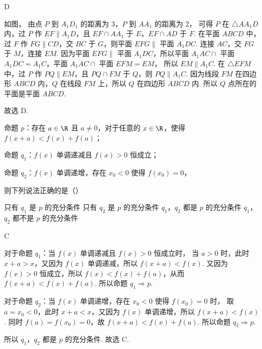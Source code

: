 \begin{answer}
D
\end{answer}

\begin{solution}
如图，
由点 \(P\) 到 \(A_1D_1\) 的距离为 \(3\)，\(P\) 到 \(AA_1\) 的距离为 \(2\)，
可得 \(P\) 在 \(\triangle AA_1D\) 内，过 \(P\) 作 \(EF\parallel A_1D\)，且 \(EF\cap AA_1\) 于 \(E\)，\(EF\cap AD\) 于 \(F\).
在平面 \(ABCD\) 中，过 \(F\) 作 \(FG\parallel CD\)，交 \(BC\) 于 \(G\)，则平面 \(EFG\parallel\) 平面 \(A_1DC\).
连接 \(AC\)，交 \(FG\) 于 \(M\)，连接 \(EM\).
因为平面 \(EFG\parallel\) 平面 \(A_1DC\)，所以平面 \(A_1AC\cap\) 平面 \(A_1DC=A_1C\)，平面 \(A_1AC\cap\) 平面 \(EFM=EM\)，
所以 \(EM\parallel A_1C\).
在 \(\triangle EFM\) 中，过 \(P\) 作 \(PQ\parallel EM\)，且 \(PQ\cap FM\) 于 \(Q\)，则 \(PQ\parallel A_1C\).
因为线段 \(FM\) 在四边形 \(ABCD\) 内，\(Q\) 在线段 \(FM\) 上，所以 \(Q\) 在四边形 \(ABCD\) 内.
所以 \(Q\) 点所在的平面是平面 \(ABCD\).

故选 D.
\end{solution}

\begin{problem}
命题 \(p\)：存在 \(a\in\R\) 且 \(a\neq0\)，对于任意的 \(x\in\R\)，使得 \(f(x+a)<f(x)+f(a)\)；

命题 \(q_1\)：\(f(x)\) 单调递减且 \(f(x)>0\) 恒成立；

命题 \(q_2\)：\(f(x)\) 单调递增，存在 \(x_0<0\) 使得 \(f(x_0)=0\)，

则下列说法正确的是（\quad）

\choices
    {只有 \(q_1\) 是 \(p\) 的充分条件}
    {只有 \(q_2\) 是 \(p\) 的充分条件}
    {\(q_1\)，\(q_2\) 都是 \(p\) 的充分条件}
    {\(q_1\)，\(q_2\) 都不是 \(p\) 的充分条件}
\end{problem}

\begin{answer}
C
\end{answer}

\begin{solution}
对于命题 \(q_1\)：当 \(f(x)\) 单调递减且 \(f(x)>0\) 恒成立时，
当 \(a>0\) 时，此时 \(x+a>x\)，又因为 \(f(x)\) 单调递减，所以 \(f(x+a)<f(x)\).
又因为 \(f(x)>0\) 恒成立，所以 \(f(x)<f(x)+f(a)\)，从而
\(f(x+a)<f(x)+f(a)\).
所以命题 \(q_1\Rightarrow p\).

对于命题 \(q_2\)：当 \(f(x)\) 单调递增，存在 \(x_0<0\) 使得 \(f(x_0)=0\) 时，
取 \(a=x_0<0\)，此时 \(x+a<x\)，又因为 \(f(x)\) 单调递增，所以
\(f(x+a)<f(x)\).
同时 \(f(a)=f(x_0)=0\)，故
\(f(x+a)<f(x)+f(a)\).
所以命题 \(q_2\Rightarrow p\).

所以 \(q_1\)，\(q_2\) 都是 \(p\) 的充分条件.
故选 C.
\end{solution}
